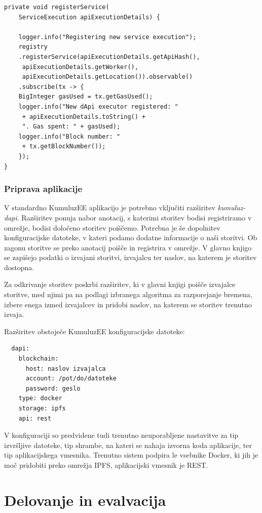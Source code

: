 \documentclass[a4paper, 12pt]{book}
\begin{document}
\begin{lstlisting}
private void registerService(
	ServiceExecution apiExecutionDetails) {
	
	logger.info("Registering new service execution");
	registry
	.registerService(apiExecutionDetails.getApiHash(),
	 apiExecutionDetails.getWorker(),
	 apiExecutionDetails.getLocation()).observable()
	.subscribe(tx -> {
	BigInteger gasUsed = tx.getGasUsed();
	logger.info("New dApi executor registered: "
	 + apiExecutionDetails.toString() + 
	 ". Gas spent: " + gasUsed);
	logger.info("Block number: "
	 + tx.getBlockNumber());
	});
}
\end{lstlisting}


\subsection{Priprava aplikacije}
V standardno KumuluzEE aplikacijo je potrebno vključiti razširitev \textit{kumuluz-dapi}. 
Razširitev ponuja nabor anotacij, s katerimi storitev bodisi registriramo v omrežje, bodisi določeno storitev poiščemo.
Potrebna je še dopolnitev konfiguracijske datoteke, v kateri podamo dodatne informacije o naši storitvi.
Ob zagonu storitve se preko anotacij poišče in registrira v omrežje.
V glavno knjigo se zapišejo podatki o izvajani storitvi, izvajalcu ter naslov, na katerem je storitev dostopna.

Za odkrivanje storitev poskrbi razširitev, ki v glavni knjigi poišče izvajalce storitve, med njimi pa na podlagi izbranega algoritma za razporejanje bremena, izbere enega izmed izvajalcev in pridobi naslov, na katerem se storitev trenutno izvaja.

Razširitev obstoječe KumuluzEE konfiguracijske datoteke:
\begin{lstlisting}
  dapi:
    blockchain:
      host: naslov izvajalca
      account: /pot/do/datoteke
      password: geslo
    type: docker
    storage: ipfs
    api: rest
\end{lstlisting}

V konfiguraciji so predvidene tudi trenutno neuporabljene nastavitve za tip izvršljive datoteke, tip shrambe, na kateri se nahaja izvorna koda aplikacije, ter tip aplikacijskega vmesnika.
Trenutno sistem podpira le vsebnike Docker, ki jih je moč pridobiti preko omrežja IPFS, aplikacijski vmesnik je REST.


\chapter{Delovanje in evalvacija}
\end{document}
